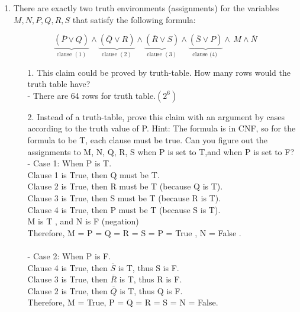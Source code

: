 \documentclass[11pt]{article}
\begin{document}
\begin{enumerate}
\newpage
\item There are exactly two truth environments (assignments)
  for the variables $M, N, P, Q, R, S$ that satisfy the following
  formula:
  
  \[\underbrace{(\bar{P} \lor Q)}_{\text {clause }(1)} \land \underbrace{(\bar{Q} \lor R)}_{\text {clause }(2)} \land \underbrace{(\bar{R} \lor S)}_{\text {clause }(3)} \land \underbrace{(\bar{S} \lor P)}_{\text {clause (4) }} \land\, M \land \bar{N}\]

  \begin{enumerate}
  \item[1.] This claim could be proved by truth-table. How many rows would the truth table have? \\
  
  - There are 64 rows for truth table.$(2^6)$ \\
  \item[2.] Instead of a truth-table, prove this claim with an argument by cases according to the truth value of P. Hint: The formula is in CNF, so for the formula to be T, each clause must be true. Can you figure out the assignments to M, N, Q, R, S when P is set to T,and when P is set to F?\\
  
  - Case 1: When P is T.\\
    Clause 1 is True, then Q must be T.\\
    Clause 2 is True, then R must be T (because Q is T).\\
    Clause 3 is True, then S must be T (because R is T).\\
    Clause 4 is True, then P must be T (because S is T).\\
    M is T , and N is F (negation)\\
    Therefore, M = P = Q = R = S = P = True , N = False .\\
    \\
    - Case 2: When P is F.\\
    Clause 4 is True, then $\overline{S}$ is T, thus S is F.\\
    Clause 3 is True, then $\overline{R}$ is T, thus R is F.\\
    Clause 2 is True, then $\overline{Q}$ is T, thus Q is F.\\
    Therefore, M = True, P = Q = R = S = N = False.\\
    
  
  
  
  \end{enumerate}


\end{enumerate}
\end{document}
